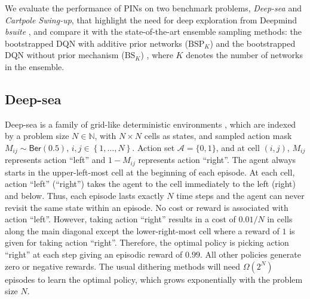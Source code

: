 \documentclass[letterpaper]{article} %
\newcommand{\Sp}[1]{\left(#1\right)}
\newcommand{\Bp}[1]{\left\{#1\right\}}
\theoremstyle{definition}
\begin{document}
We evaluate the performance of PINs on two benchmark problems, \textit{Deep-sea} and \textit{Cartpole Swing-up}, that highlight the need for deep exploration from Deepmind \textit{bsuite} \cite{osband2019bsuite}, and compare it with the state-of-the-art ensemble sampling methods: the bootstrapped DQN with additive prior networks ($\mathrm{BSP}_K$) \cite{osband2018randomized} and the bootstrapped DQN without prior mechanism ($\mathrm{BS}_{K}$) \cite{osband2016deep}, where $K$ denotes the number of networks in the ensemble.

\subsection{Deep-sea}
Deep-sea is a family of grid-like deterministic environments \cite{osband2017deep}, which are indexed by a problem size $N \in \mathbb{N}$, with $N \times N$ cells as states, and sampled action mask $M_{ij}\sim\mathsf{Ber}(0.5)$, $i, j\in\Bp{1, \dots, N}$. Action set $\mathcal{A} = \{0, 1\}$, and at cell $\Sp{i, j}$, $M_{ij}$ represents action ``left'' and $1-M_{ij}$ represents action ``right''. The agent always starts in the upper-left-most cell at the beginning of each episode. At each cell, action ``left'' (``right'') takes the agent to the cell immediately to the left (right) and below. Thus, each episode lasts exactly $N$ time steps and the agent can never revisit the same state within an episode. No cost or reward is associated with action ``left''. However, taking action ``right'' results in a cost of $0.01/N$ in cells along the main diagonal except the lower-right-most cell where a reward of $1$ is given for taking action ``right''. Therefore, the optimal policy is picking action ``right'' at each step giving an episodic reward of $0.99$. All other policies generate zero or negative rewards. The usual dithering methods will need $\Omega\Sp{2^N}$ episodes to learn the optimal policy, which grows exponentially with the problem size $N$.
\end{document}
